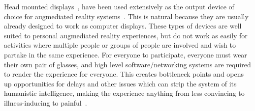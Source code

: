 \documentclass{sigchi-ext}
\begin{document}

Head mounted displays~\cite{mann1997wearable}, have been used extensively as
the output device of choice for augmediated reality
systems~\cite{caudell1992augmented}.
This is natural because they are usually already
designed to work as computer displays. These types of devices are well suited
to personal augmediated reality experiences, but do not work as easily for
activities where multiple people or groups of people are involved and wish to
partake in the same experience. For everyone to participate, everyone must wear
their own pair of glasses, and high level software/networking systems are
required to render the experience for everyone. This creates bottleneck points
and opens up opportunities for delays and other issues which can strip the
system of its humanistic intelligence, making the experience anything from less
convincing to illness-inducing to painful~\cite{drascic1996perceptual}.
\end{document}
